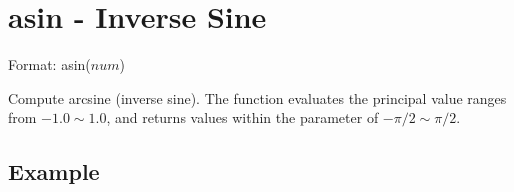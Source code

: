 
%

\section{asin - Inverse Sine\label{sect:asin}}

Format: asin($num$)

Compute arcsine (inverse sine). The function evaluates the principal value ranges from  $-1.0\sim 1.0$, and returns values within the parameter of $-\pi/2\sim \pi/2$.


\subsection*{Example}


%

